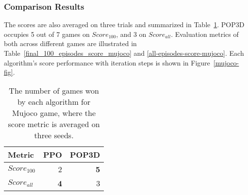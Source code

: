 \documentclass{article}
\begin{document}
\subsubsection{Comparison Results}

The scores are also averaged on three trials and summarized in Table~\ref{comparison_summary}. POP3D occupies 5 out of 7 games on $Score_{100}$, and  3  on $Score_{all}$. Evaluation metrics of both across different games are illustrated in  Table~\ref{final_100_episodes_score_mujoco} and \ref{all-episodes-score-mujoco}. Each algorithm's score performance with iteration steps is shown in Figure~\ref{mujoco-fig}.
\begin{table}
	\begin{center}
		\begin{tabular}{lrr}
			\toprule
			Metric& PPO & POP3D \\
			\midrule
			$Score_{100}$  &2 &  \textbf{5} \\
			$Score_{all}$   & \textbf{4} &3\\
			\bottomrule
		\end{tabular}
	\end{center}
	\caption{The number of games won by each algorithm for Mujoco game, where the score metric is averaged on three seeds.}
	\label{comparison_summary}
\end{table} 
\end{document}
